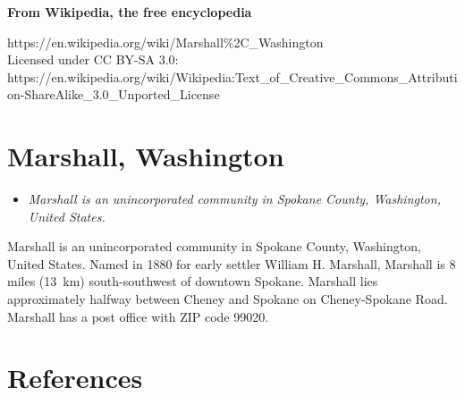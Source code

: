 \textbf{From Wikipedia, the free encyclopedia}

https://en.wikipedia.org/wiki/Marshall\%2C\_Washington\\
Licensed under CC BY-SA 3.0:\\
https://en.wikipedia.org/wiki/Wikipedia:Text\_of\_Creative\_Commons\_Attribution-ShareAlike\_3.0\_Unported\_License

\section{Marshall, Washington}\label{marshall-washington}

\begin{itemize}
\item
  \emph{Marshall is an unincorporated community in Spokane County,
  Washington, United States.}
\end{itemize}

Marshall is an unincorporated community in Spokane County, Washington,
United States. Named in 1880 for early settler William H. Marshall,
Marshall is 8 miles (13~km) south-southwest of downtown Spokane.
Marshall lies approximately halfway between Cheney and Spokane on
Cheney-Spokane Road. Marshall has a post office with ZIP code 99020.

\section{References}\label{references}
